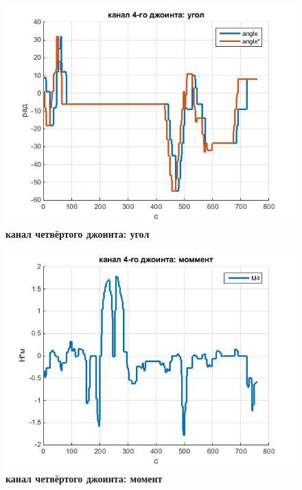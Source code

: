 \documentclass[a4paper,14pt,russian]{extreport} \usepackage{extsizes}
\begin{document}
			\begin{figure}[h!]
				\centering		 
				\includegraphics[width=5.5in]{./graph/j4.jpg}	
				\caption{
					\textbf{канал четвёртого джоинта: угол}
				}     
				\label{fig_img151}
			\end{figure}
				\begin{figure}[h!]
					\centering		 
					\includegraphics[width=5.5in]{./graph/m4.jpg}	
					\caption{
						\textbf{канал четвёртого джоинта: момент}
					}
					\label{fig_img54}
				\end{figure}
\end{document}
